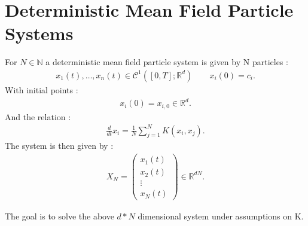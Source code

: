 \chapter{Deterministic Mean Field Particle Systems}
\begin{definition}
  For $N \in  \mathbb{N}$ a deterministic mean field particle system is given by N particles : 
  \begin{align*}
   x_1(t),\ldots ,x_n(t) \in  \mathcal{C}^{1}([0,T];\mathbb{R}^{d } )  \qquad x_i(0) = c_i
  .\end{align*}
  With initial points : 
  \begin{align*}
    x_i(0) = x_{i,0} \in \mathbb{R}^{d} 
  .\end{align*}
  And the relation : 
  \begin{align*}
    \frac{d}{dt} x_{i} = \frac{1}{N} \sum_{j=1}^{N}  K(x_i,x_{j})
  .\end{align*}
  The system is then given by : 
  \begin{align*}
    X_N = \begin{pmatrix} x_1(t) \\ x_2(t) \\ \vdots \\ x_N(t)  \end{pmatrix} \in \mathbb{R}^{dN} 
  .\end{align*}
\end{definition}
The goal is to solve the above $d*N$ dimensional system under assumptions on K.
